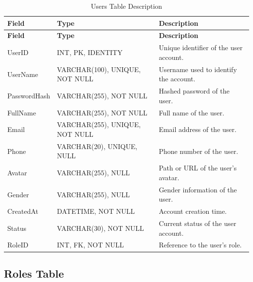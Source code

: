 \begin{longtable}{
		|>{\raggedright\arraybackslash}p{3.2cm}|
		>{\raggedright\arraybackslash}p{4.2cm}|
		>{\raggedright\arraybackslash}p{5.0cm}|
	}
	\caption{Users Table Description}
	\label{tab:users}\\
	\hline
	\textbf{Field} & \textbf{Type} & \textbf{Description} \\ \hline
	\endfirsthead
	\hline
	\textbf{Field} & \textbf{Type} & \textbf{Description} \\ \hline
	\endhead
	
	UserID & INT, PK, IDENTITY &
	Unique identifier of the user account. \\ \hline
	
	UserName & VARCHAR(100), UNIQUE, NOT NULL &
	Username used to identify the account. \\ \hline
	
	PasswordHash & VARCHAR(255), NOT NULL &
	Hashed password of the user. \\ \hline
	
	FullName & VARCHAR(255), NOT NULL &
	Full name of the user. \\ \hline
	
	Email & VARCHAR(255), UNIQUE, NOT NULL &
	Email address of the user. \\ \hline
	
	Phone & VARCHAR(20), UNIQUE, NULL &
	Phone number of the user. \\ \hline
	
	Avatar & VARCHAR(255), NULL &
	Path or URL of the user's avatar. \\ \hline
	
	Gender & VARCHAR(255), NULL &
	Gender information of the user. \\ \hline
	
	CreatedAt & DATETIME, NOT NULL &
	Account creation time. \\ \hline
	
	Status & VARCHAR(30), NOT NULL &
	Current status of the user account. \\ \hline
	
	RoleID & INT, FK, NOT NULL &
	Reference to the user's role. \\ \hline
	
\end{longtable}


\subsection{Roles Table}


